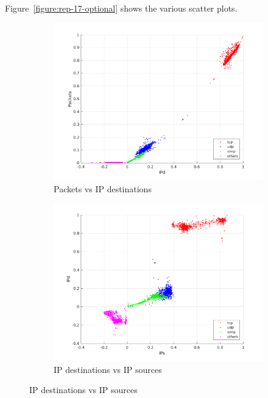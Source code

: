 \documentclass{article}
\begin{document}
Figure~\ref{figure:rep-17-optional} shows the various scatter plots.

\begin{figure}[h]
    \begin{subfigure}{.5\textwidth}
        \centering
        \includegraphics[width=\textwidth]{../exercise-3/plots/rep_17_optional_IPdPackets.png}
        \caption{Packets vs IP destinations}
    \end{subfigure}
    \begin{subfigure}{.5\textwidth}
        \centering
        \includegraphics[width=\textwidth]{../exercise-3/plots/rep_17_optional_IPsIPd.png}
        \caption{IP destinations vs IP sources}
    \end{subfigure}

\end{figure}
\end{document}
